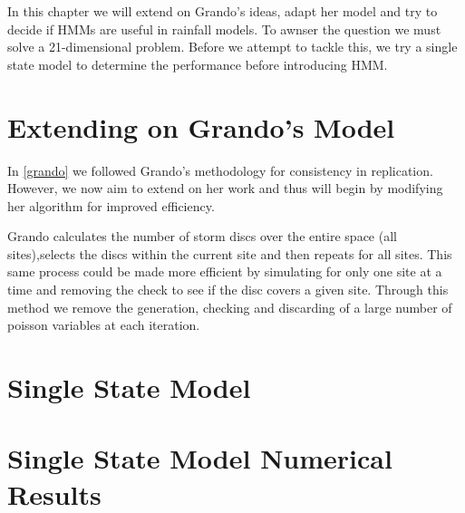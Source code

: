 In this chapter we will extend on Grando's ideas, adapt her model and try to decide if HMMs are useful in rainfall models. To awnser the question we must solve a 21-dimensional problem. Before we attempt to tackle this, we try a single state model to determine the performance before introducing HMM.

\section{Extending on Grando's Model}
In \ref{grando} we followed Grando's methodology for consistency in replication. However, we now aim to extend on her work and thus will begin by modifying her algorithm for improved efficiency.

Grando calculates the number of storm discs over the entire space (all sites),selects the discs within the current site and then repeats for all sites. This same process could be made more efficient by simulating for only one site at a time and removing the check to see if the disc covers a given site. Through this method we remove the generation, checking and discarding of a large number of poisson variables at each iteration. 


\section{Single State Model}

\section{Single State Model Numerical Results}
